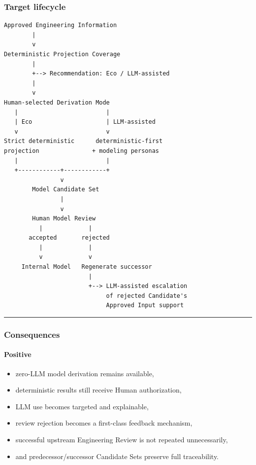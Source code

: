 \hypertarget{target-lifecycle}{%
\subsubsection{Target lifecycle}\label{target-lifecycle}}

\begin{verbatim}
Approved Engineering Information
        |
        v
Deterministic Projection Coverage
        |
        +--> Recommendation: Eco / LLM-assisted
        |
        v
Human-selected Derivation Mode
   |                         |
   | Eco                     | LLM-assisted
   v                         v
Strict deterministic      deterministic-first
projection               + modeling personas
   |                         |
   +------------+------------+
                v
        Model Candidate Set
                |
                v
        Human Model Review
          |             |
       accepted       rejected
          |             |
          v             v
     Internal Model   Regenerate successor
                        |
                        +--> LLM-assisted escalation
                             of rejected Candidate's
                             Approved Input support
\end{verbatim}

\begin{center}\rule{0.5\linewidth}{0.5pt}\end{center}

\hypertarget{consequences-12}{%
\subsubsection{Consequences}\label{consequences-12}}

\hypertarget{positive-4}{%
\paragraph{Positive}\label{positive-4}}

\begin{itemize}
\tightlist
\item
  zero-LLM model derivation remains available,
\item
  deterministic results still receive Human authorization,
\item
  LLM use becomes targeted and explainable,
\item
  review rejection becomes a first-class feedback mechanism,
\item
  successful upstream Engineering Review is not repeated unnecessarily,
\item
  and predecessor/successor Candidate Sets preserve full traceability.
\end{itemize}

